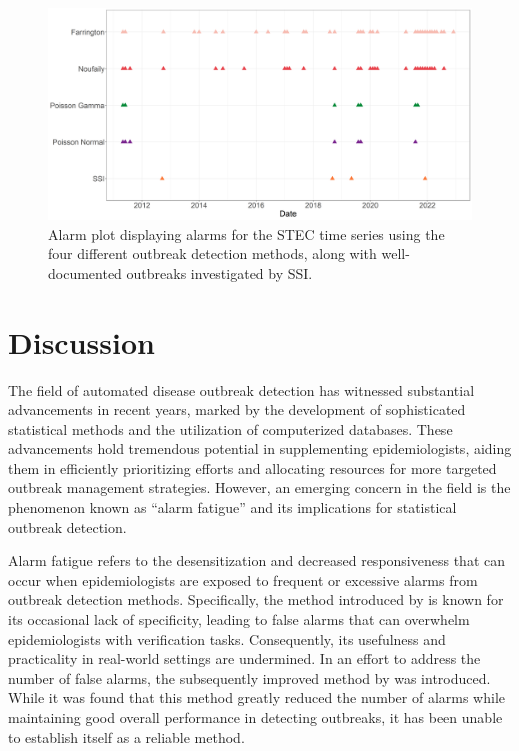 \documentclass[preprint, 3p, authoryear]{elsarticle} %
\begin{document}
\begin{figure}[H]
\includegraphics[width=1\linewidth]{../../figures/Compare_alarms_STEC_article} \caption{Alarm plot displaying alarms for the STEC time series using the four different outbreak detection methods, along with well-documented outbreaks investigated by SSI.}\label{fig:CompareAlarms}
\end{figure}

\hypertarget{discussion}{%
\section{Discussion}\label{discussion}}

The field of automated disease outbreak detection has witnessed substantial advancements in recent years, marked by the development of sophisticated statistical methods and the utilization of computerized databases. These advancements hold tremendous potential in supplementing epidemiologists, aiding them in efficiently prioritizing efforts and allocating resources for more targeted outbreak management strategies. However, an emerging concern in the field is the phenomenon known as ``alarm fatigue'' and its implications for statistical outbreak detection.

Alarm fatigue refers to the desensitization and decreased responsiveness that can occur when epidemiologists are exposed to frequent or excessive alarms from outbreak detection methods. Specifically, the method introduced by \citet{Farrington_1996} is known for its occasional lack of specificity, leading to false alarms that can overwhelm epidemiologists with verification tasks. Consequently, its usefulness and practicality in real-world settings are undermined. In an effort to address the number of false alarms, the subsequently improved method by \citet{Noufaily_2013} was introduced. While it was found that this method greatly reduced the number of alarms while maintaining good overall performance in detecting outbreaks, it has been unable to establish itself as a reliable method.
\end{document}
